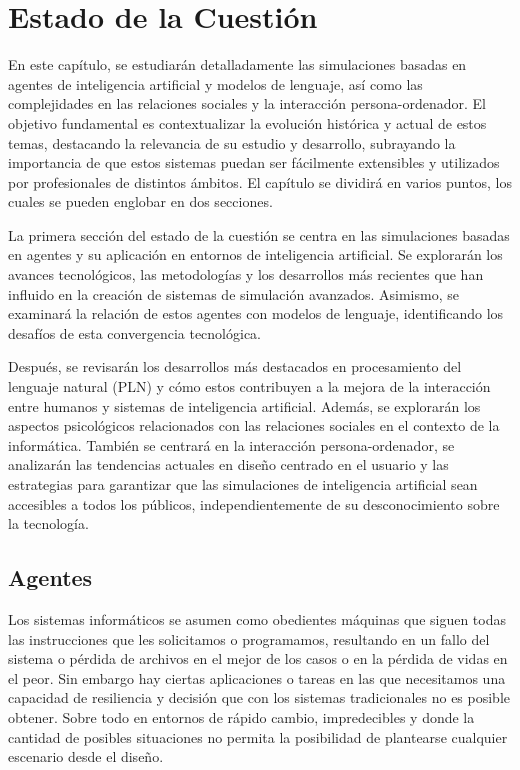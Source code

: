 \chapter{Estado de la Cuestión}
\label{cap:estadoDeLaCuestion}

En este capítulo, se estudiarán detalladamente las simulaciones basadas en agentes de inteligencia artificial y modelos de lenguaje, así como las complejidades en las relaciones sociales y la interacción persona-ordenador. El objetivo fundamental es contextualizar la evolución histórica y actual de estos temas, destacando la relevancia de su estudio y desarrollo, subrayando la importancia de que estos sistemas puedan ser fácilmente extensibles y utilizados por profesionales de distintos ámbitos. El capítulo se dividirá en varios puntos, los cuales se pueden englobar en dos secciones.

La primera sección del estado de la cuestión se centra en las simulaciones basadas en agentes y su aplicación en entornos de inteligencia artificial. Se explorarán los avances tecnológicos, las metodologías y los desarrollos más recientes que han influido en la creación de sistemas de simulación avanzados. Asimismo, se examinará la relación de estos agentes con modelos de lenguaje, identificando los desafíos de esta convergencia tecnológica.

Después, se revisarán los desarrollos más destacados en procesamiento del lenguaje natural (PLN) y cómo estos contribuyen a la mejora de la interacción entre humanos y sistemas de inteligencia artificial. Además, se explorarán los aspectos psicológicos relacionados con las relaciones sociales en el contexto de la informática. También se centrará en la interacción persona-ordenador, se analizarán las tendencias actuales en diseño centrado en el usuario y las estrategias para garantizar que las simulaciones de inteligencia artificial sean accesibles a todos los públicos, independientemente de su desconocimiento sobre la tecnología.
\section{Agentes}

Los sistemas informáticos se asumen como obedientes máquinas que siguen todas las instrucciones que les solicitamos o programamos, resultando en un fallo del sistema o pérdida de archivos en el mejor de los casos o en la pérdida de vidas en el peor. Sin embargo hay ciertas aplicaciones o tareas en las que necesitamos una capacidad de resiliencia y decisión que con los sistemas tradicionales no es posible obtener. Sobre todo en entornos de rápido cambio, impredecibles y donde la cantidad de posibles situaciones no permita la posibilidad de plantearse cualquier escenario desde el diseño.

